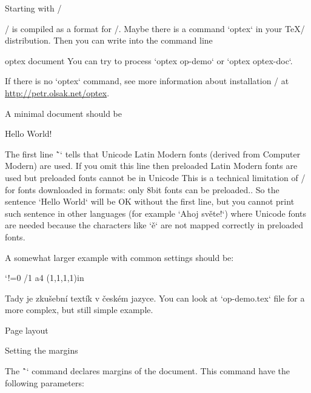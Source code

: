 

\let\new=\relax

\sec Starting with \OpTeX/

\new
\OpTeX/ is compiled as a format for \LuaTeX/. Maybe there is a command
`optex` in your \TeX/ distribution. Then you can write into the command line

\begtt
optex document
\endtt
%
You can try to process `optex op-demo` or `optex optex-doc`.

If there is no `optex` command, see more information about installation
\OpTeX/ at \url{http://petr.olsak.net/optex}.

A minimal document should be

\begtt
\fontfam[LMfonts]
Hello World! \bye
\endtt

The first line \~`\fontfam[LMfonts]` tells that Unicode Latin Modern
fonts (derived from Computer Modern) are used. If you omit this line then
preloaded Latin Modern fonts are used but preloaded fonts cannot be in
Unicode\fnote
{This is a technical limitation of \LuaTeX/ for fonts downloaded in formats:
only 8bit fonts can be preloaded.}.
So the sentence `Hello World` will be OK without the first line, but you
cannot print such sentence in other languages (for example `Ahoj světe!`)
where Unicode fonts are needed
because the characters like `ě` are not mapped correctly in preloaded
fonts.

A somewhat larger example with common settings should be:

\begtt \catcode`!=0
\fontfam[Termes]  %
\typosize[11/13]  %
\margins/1 a4 (1,1,1,1)in %
\cslang           %

Tady je zkušební textík v českém jazyce.
\bye
\endtt
%
You can look at `op-demo.tex` file for a more complex, but still simple example.

\sec Page layout

\secc[marg] Setting the margins

The \^`\margins` command declares margins of the document. This command have
the following parameters:

